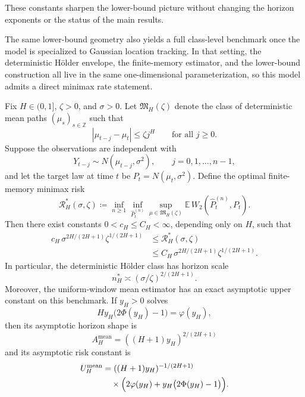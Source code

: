 These constants sharpen the lower-bound picture without changing the horizon
exponents or the status of the main results.

The same lower-bound geometry also yields a full class-level benchmark once
the model is specialized to Gaussian location tracking. In that setting, the
deterministic H\"older envelope, the finite-memory estimator, and the lower-bound
construction all live in the same one-dimensional parameterization, so this
model admits a direct minimax rate statement.

\begin{theorem}
\label{thm:gaussian_location_minimax_holder}
Fix $H\in(0,1]$, $\zeta>0$, and $\sigma>0$. Let $\mathfrak M_H(\zeta)$ denote the
class of deterministic mean paths $(\mu_s)_{s\in\mathbb Z}$ such that
\[
  |\mu_{t-j}-\mu_t|\le \zeta j^H
  \qquad\text{for all }j\ge 0.
\]
Suppose the observations are independent with
\[
  Y_{t-j}\sim N(\mu_{t-j},\sigma^2),
  \qquad j=0,1,\dots,n-1,
\]
and let the target law at time $t$ be $P_t=N(\mu_t,\sigma^2)$. Define the
optimal finite-memory minimax risk
\[
  \mathcal R_H^*(\sigma,\zeta)
  \coloneqq
  \inf_{n\ge 1}
  \inf_{\widehat P_t^{(n)}}
  \sup_{\mu\in\mathfrak M_H(\zeta)}
  \mathbb E\,W_2\!\left(\widehat P_t^{(n)},P_t\right).
\]
Then there exist constants $0<c_H\le C_H<\infty$, depending only on $H$, such
that
\[
  \begin{aligned}
  c_H\,\sigma^{2H/(2H+1)}\zeta^{1/(2H+1)}
  &\le \mathcal R_H^*(\sigma,\zeta) \\
  &\le C_H\,\sigma^{2H/(2H+1)}\zeta^{1/(2H+1)}.
  \end{aligned}
\]
In particular, the deterministic H\"older class has horizon scale
\[
  n_H^*\asymp (\sigma/\zeta)^{2/(2H+1)}.
\]
Moreover, the uniform-window mean estimator has an exact asymptotic upper
constant on this benchmark. If $y_H>0$ solves
\[
  H y_H\bigl(2\Phi(y_H)-1\bigr)=\varphi(y_H),
\]
then its asymptotic horizon shape is
\[
  A_H^{\mathrm{mean}}=((H+1)y_H)^{2/(2H+1)}
\]
and its asymptotic risk constant is
\[
  \begin{aligned}
  U_H^{\mathrm{mean}}
  &= ((H+1)y_H)^{-1/(2H+1)} \\
  &\quad \times \Bigl(2\varphi(y_H)+y_H\bigl(2\Phi(y_H)-1\bigr)\Bigr).
  \end{aligned}
\]
\end{theorem}

